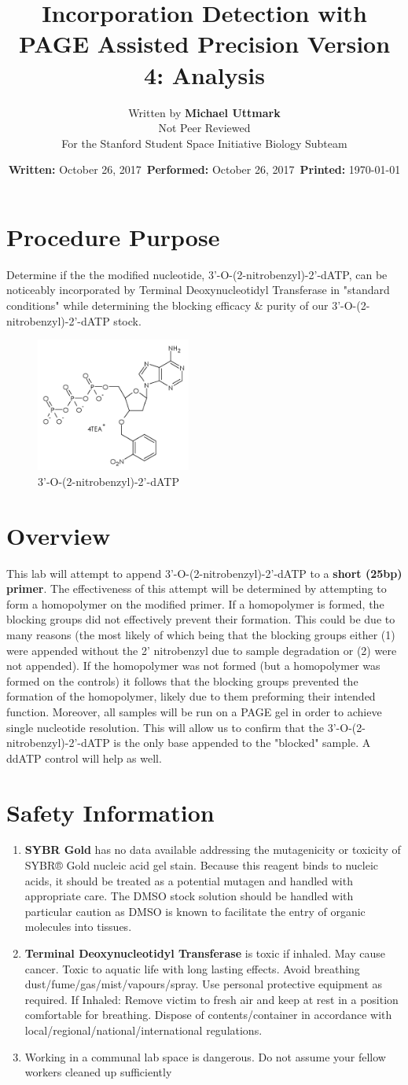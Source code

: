 \documentclass[letterpaper]{article}
\title{\BdATP{} Incorporation Detection with PAGE Assisted Precision Version 4: Analysis} %
\author{Written by \textbf{Michael Uttmark}\\ %
		Not Peer Reviewed\\%
        For the Stanford Student Space Initiative Biology Subteam}
\date{\textbf{Written:} October 26, 2017 \,\textbf{Performed:} October 26, 2017 \,\textbf{Printed:} \today{}}
\newenvironment{safety}{%
\begin{tcolorbox}[width=\textwidth, colframe=safetyFrame, arc=1.5mm]
}%
{\end{tcolorbox}}
\newcommand{\tdt}{Terminal Deoxynucleotidyl Transferase}
\newcommand{\BdATP}{3'-O-(2-nitrobenzyl)-2'-dATP}
\newcommand{\SYBRGOLD}{\item{\textbf{SYBR Gold} has no data available addressing the mutagenicity or toxicity of SYBR® Gold nucleic acid gel stain. Because this reagent binds to nucleic acids, it should be treated as a potential mutagen and handled with appropriate care. The DMSO stock solution should be handled with particular caution as DMSO is known to facilitate the entry of organic molecules into tissues.\cite{sybrGold}}}
\newcommand{\tdtSafety}{\item{\textbf{\tdt{}} is toxic if inhaled. May cause cancer. Toxic to aquatic life with long lasting effects. Avoid breathing dust/fume/gas/mist/vapours/spray. Use personal protective equipment as required. If Inhaled: Remove victim to fresh air and keep at rest in a position comfortable for breathing. Dispose of contents/container in accordance with local/regional/national/international regulations.\cite{Invitrogen2002}}}
\begin{document}
\maketitle
\section{Procedure Purpose} %
Determine if the the modified nucleotide, \BdATP{}, can be noticeably incorporated by \tdt{} in "standard conditions" while determining the blocking efficacy \& purity of our \BdATP{} stock.
\begin{figure}[ht]
\centering
\includegraphics[width=2in]{./resources/BdATP-Structure.png}
\caption{\BdATP{}}
\label{bdatp}
\end{figure}
\section{Overview} %
This lab will attempt to append \BdATP{} to a \textbf{short (25bp) primer}. The effectiveness of this attempt will be determined by attempting to form a homopolymer on the modified primer. If a homopolymer is formed, the blocking groups did not effectively prevent their formation. This could be due to many reasons (the most likely of which being that the blocking groups either (1) were appended without the 2' nitrobenzyl due to sample degradation or (2) were not appended). If the homopolymer was not formed (but a homopolymer was formed on the controls) it follows that the blocking groups prevented the formation of the homopolymer, likely due to them preforming their intended function. Moreover, all samples will be run on a PAGE gel in order to achieve single nucleotide resolution. This will allow us to confirm that the \BdATP{} is the only base appended to the "blocked" sample. A ddATP control will help as well.

\section{Safety Information}
\begin{safety}
\begin{enumerate}
\SYBRGOLD{} %
\tdtSafety{}
\item{Working in a communal lab space is dangerous. Do not assume your fellow workers cleaned up sufficiently}
\end{enumerate}
\end{safety}
\end{document}
